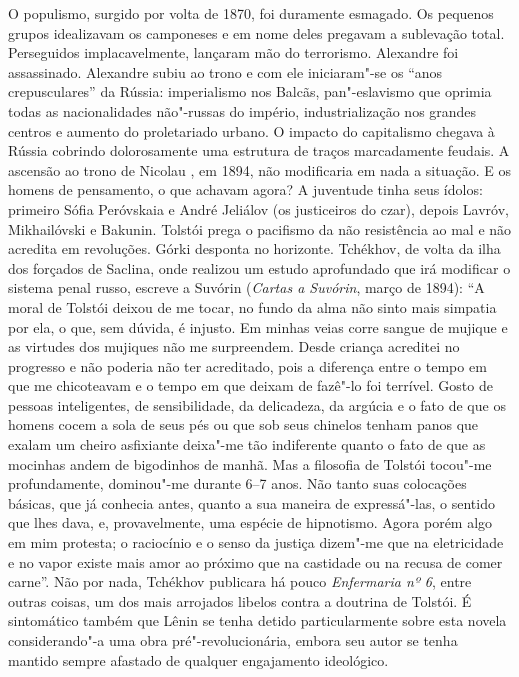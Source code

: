 O populismo, surgido por volta de 1870, foi duramente esmagado. Os
pequenos grupos idealizavam os camponeses e em nome deles pregavam a
sublevação total. Perseguidos implacavelmente, lançaram mão do
terrorismo. Alexandre  foi assassinado. Alexandre  subiu ao trono e
com ele iniciaram"-se os ``anos crepusculares'' da Rússia: imperialismo
nos Balcãs, pan"-eslavismo que oprimia todas as nacionalidades não"-russas
do império, industrialização nos grandes centros e aumento do
proletariado urbano. O impacto do capitalismo chegava à Rússia cobrindo
dolorosamente uma estrutura de traços marcadamente feudais. A ascensão
ao trono de Nicolau , em 1894, não modificaria em nada a situação. E os
homens de pensamento, o que achavam agora? A juventude tinha seus ídolos:
primeiro Sófia Peróvskaia e André Jeliálov (os justiceiros do czar),
depois Lavróv, Mikhailóvski e Bakunin. Tolstói prega o pacifismo da não
resistência ao mal e não acredita em revoluções. Górki desponta no
horizonte. Tchékhov, de volta da ilha dos forçados de Saclina, onde realizou um
estudo aprofundado que irá modificar o sistema penal russo, escreve
a Suvórin (\emph{Cartas a Suvórin}, março de 1894): ``A moral de Tolstói deixou de me
tocar, no fundo da alma não sinto mais simpatia por ela, o que, sem
dúvida, é injusto. Em minhas veias corre sangue de mujique e as virtudes
dos mujiques não me surpreendem. Desde criança acreditei no progresso e
não poderia não ter acreditado, pois a diferença entre o tempo em que me
chicoteavam e o tempo em que deixam de fazê"-lo foi terrível. Gosto de
pessoas inteligentes, de sensibilidade, da delicadeza, da argúcia e o
fato de que os homens cocem a sola de seus pés ou que sob seus chinelos
tenham panos que exalam um cheiro asfixiante deixa"-me tão indiferente
quanto o fato de que as mocinhas andem de bigodinhos de manhã. Mas a
filosofia de Tolstói tocou"-me profundamente, dominou"-me durante 6--7
anos. Não tanto suas colocações básicas, que já conhecia antes, quanto a
sua maneira de expressá"-las, o sentido que lhes dava, e, provavelmente,
uma espécie de hipnotismo. Agora porém algo em mim protesta; o
raciocínio e o senso da justiça dizem"-me que na eletricidade e no vapor
existe mais amor ao próximo que na castidade ou na recusa de comer
carne''. Não por nada, Tchékhov publicara há pouco \emph{Enfermaria nº
6}, entre outras coisas, um dos mais arrojados libelos contra a doutrina
de Tolstói. É sintomático também que Lênin se tenha detido
particularmente sobre esta novela considerando"-a uma obra
pré"-revolucionária, embora seu autor se tenha mantido sempre afastado de
qualquer engajamento ideológico.

